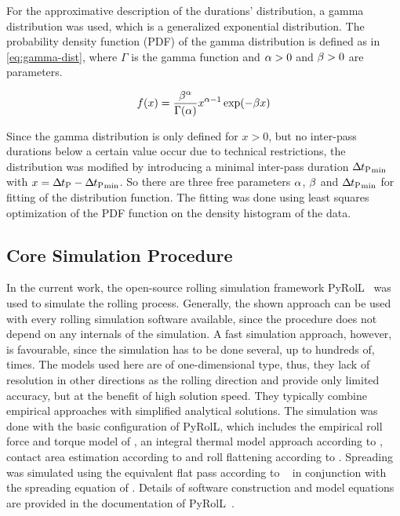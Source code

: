 For the approximative description of the durations' distribution, a gamma distribution was used, which is a generalized exponential distribution.
The probability density function (PDF) of the gamma distribution is defined as in \autoref{eq:gamma-dist}, where $\Gamma$ is the gamma function and ${\alpha} > 0$ and ${\beta} > 0$ are parameters.

\begin{equation}
    f(x) = \frac{{\beta}^{\alpha}}{\Gamma({\alpha})}x^{{\alpha} - 1} \exp(-{\beta} x)
    \label{eq:gamma-dist}
\end{equation}

Since the gamma distribution is only defined for $x>0$, but no inter-pass durations below a certain value occur due to technical restrictions, the distribution was modified by introducing a minimal inter-pass duration ${{{\Delta\mspace{-1mu}t}_\mathrm{P}}_\mathrm{min}}$ with $x = {{\Delta\mspace{-1mu}t}_\mathrm{P}} - {{{\Delta\mspace{-1mu}t}_\mathrm{P}}_\mathrm{min}}$.
So there are three free parameters ${\alpha}$, ${\beta}$ and ${{{\Delta\mspace{-1mu}t}_\mathrm{P}}_\mathrm{min}}$ for fitting of the distribution function.
The fitting was done using least squares optimization of the PDF function on the density histogram of the data.

\subsection{Core Simulation Procedure}\label{subsec:simulation-procedure}

In the current work, the open-source rolling simulation framework PyRolL~\cite{pyroll2} was used to simulate the rolling process.
Generally, the shown approach can be used with every rolling simulation software available, since the procedure does not depend on any internals of the simulation.
A fast simulation approach, however, is favourable, since the simulation has to be done several, up to hundreds of, times.
The models used here are of one-dimensional type, thus, they lack of resolution in other directions as the rolling direction and provide only limited accuracy, but at the benefit of high solution speed.
They typically combine empirical approaches with simplified analytical solutions.
The simulation was done with the basic configuration of PyRolL, which includes the empirical roll force and torque model of \textcite{Hensel1978}, an integral thermal model approach according to \textcite{Hensel1990}, contact area estimation according to \textcite{Zouhar1960} and roll flattening according to \textcite{Hitchcock1935}.
Spreading was simulated using the equivalent flat pass according to \citeauthor*{Lendl1948}~\cite{Lendl1948, Lendl1948a, Lendl1949} in conjunction with the spreading equation of \textcite{Wusatowski1969}.
Details of software construction and model equations are provided in the documentation of PyRolL~\cite{pyroll}.


